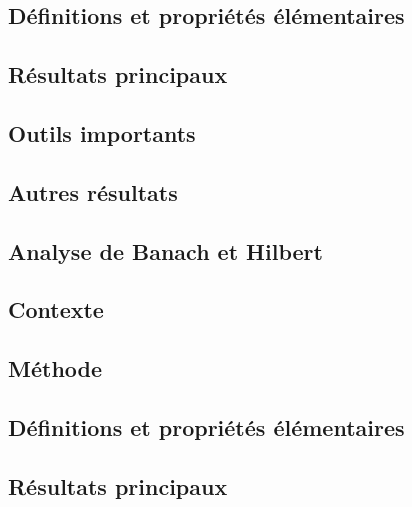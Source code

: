 \documentclass[11pt,a4paper]{article}
\begin{document}
\subsection*{Définitions et propriétés élémentaires}

\subsection*{Résultats principaux}

\subsection*{Outils importants}

\subsection*{Autres résultats}


\newpage
\begin{center}  
\section*{Analyse de Banach et Hilbert} 
\end{center}



\subsection*{Contexte}

\subsection*{Méthode}

\subsection*{Définitions et propriétés élémentaires}

\subsection*{Résultats principaux}
\end{document}
